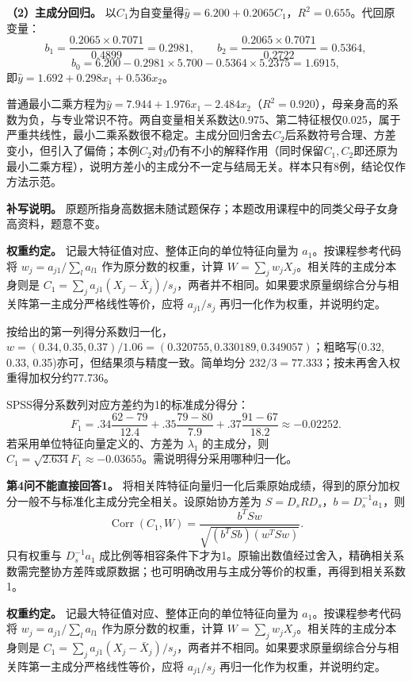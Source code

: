 \textbf{（2）主成分回归。} 以\(C_1\)为自变量得\(\hat y=6.200+0.2065C_1\)，\(R^2=0.655\)。代回原变量：
\[b_1=\frac{0.2065\times0.7071}{0.4899}=0.2981,\qquad b_2=\frac{0.2065\times0.7071}{0.2722}=0.5364,\]
\[b_0=6.200-0.2981\times5.700-0.5364\times5.2375=1.6915,\]
即\(\hat y=1.692+0.298x_1+0.536x_2\)。

普通最小二乘方程为\(\hat y=7.944+1.976x_1-2.484x_2\)（\(R^2=0.920\)），母亲身高的系数为负，与专业常识不符。两自变量相关系数达0.975、第二特征根仅0.025，属于严重共线性，最小二乘系数很不稳定。主成分回归舍去\(C_2\)后系数符号合理、方差变小，但引入了偏倚；本例\(C_2\)对\(y\)仍有不小的解释作用（同时保留\(C_1,C_2\)即还原为最小二乘方程），说明方差小的主成分不一定与结局无关。样本只有8例，结论仅作方法示范。

\textbf{补写说明。} 原题所指身高数据未随试题保存；本题改用课程中的同类父母子女身高资料，题意不变。



\textbf{权重约定。} 记最大特征值对应、整体正向的单位特征向量为 \(a_1\)。按课程参考代码将 \(w_j=a_{j1}/\sum_l a_{l1}\) 作为原分数的权重，计算 \(W=\sum_jw_jX_j\)。相关阵的主成分本身则是 \(C_1=\sum_ja_{j1}(X_j-\bar X_j)/s_j\)，两者并不相同。如果要求原量纲综合分与相关阵第一主成分严格线性等价，应将 \(a_{j1}/s_j\) 再归一化作为权重，并说明约定。

按给出的第一列得分系数归一化，\(w=(0.34,\allowbreak 0.35,\allowbreak 0.37)/1.06=(0.320755,\allowbreak 0.330189,\allowbreak 0.349057)\)；粗略写(0.32, 0.33, 0.35)亦可，但结果须与精度一致。简单均分 \(232/3=77.333\)；按未再舍入权重得加权分约77.736。

SPSS得分系数列对应方差约为1的标准成分得分： \[F_1=.34\frac{62-79}{12.4}+.35\frac{79-80}{7.9}+.37\frac{91-67}{18.2}\approx-0.02252.\] 若采用单位特征向量定义的、方差为 \(\lambda_1\) 的主成分，则 \(C_1=\sqrt{2.634}F_1\approx-0.03655\)。需说明得分采用哪种归一化。

\textbf{第4问不能直接回答1。} 将相关阵特征向量归一化后乘原始成绩，得到的原分加权分一般不与标准化主成分完全相关。设原始协方差为 \(S=D_sRD_s\)，\(b=D_s^{-1}a_1\)，则 \[\operatorname{Corr}(C_1,W)=\frac{b^TSw}{\sqrt{(b^TSb)(w^TSw)}}.\] 只有权重与 \(D_s^{-1}a_1\) 成比例等相容条件下才为1。原输出数值经过舍入，精确相关系数需完整协方差阵或原数据；也可明确改用与主成分等价的权重，再得到相关系数1。



\textbf{权重约定。} 记最大特征值对应、整体正向的单位特征向量为 \(a_1\)。按课程参考代码将 \(w_j=a_{j1}/\sum_l a_{l1}\) 作为原分数的权重，计算 \(W=\sum_jw_jX_j\)。相关阵的主成分本身则是 \(C_1=\sum_ja_{j1}(X_j-\bar X_j)/s_j\)，两者并不相同。如果要求原量纲综合分与相关阵第一主成分严格线性等价，应将 \(a_{j1}/s_j\) 再归一化作为权重，并说明约定。


